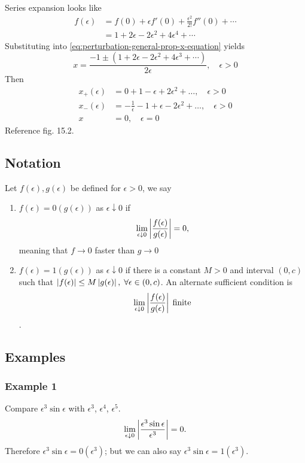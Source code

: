 \documentclass[12pt]{article}
\begin{document}
Series expansion looks like
\begin{equation*}
  \begin{aligned}
    f(\epsilon) &= f(0) + \epsilon f'(0) + \frac{\epsilon^2}{2!}f''(0)+\cdots \\
    &= 1 + 2\epsilon - 2\epsilon^2 + 4\epsilon^4 + \cdots
  \end{aligned}
\end{equation*}
Substituting into \cref{eq:perturbation-general-prop-x-equation} yields
\begin{equation*}
  x = \frac{-1\pm(1+2\epsilon-2\epsilon^2+4\epsilon^3+\cdots)}{2\epsilon},\quad \epsilon>0
\end{equation*}
Then
\begin{equation*}
  \begin{aligned}
    x_+(\epsilon) &= 0 + 1 - \epsilon + 2\epsilon^2+\ldots, \quad \epsilon>0 \\
    x_-(\epsilon) &= -\frac{1}{\epsilon}-1+\epsilon-2\epsilon^2+\ldots,\quad\epsilon>0 \\
    x&=0,\quad \epsilon=0
  \end{aligned}
\end{equation*}
Reference fig. 15.2.

\subsection{Notation}
Let $f(\epsilon),g(\epsilon)$ be defined for $\epsilon>0$, we say
\begin{enumerate}
\item $f(\epsilon)= 0(g(\epsilon))$ as $\epsilon\downarrow0$ if
$$\lim_{\epsilon\downarrow0}\left|{\frac{f(\epsilon)}{g(\epsilon)}}\right|=0,$$ meaning
that $f\rightarrow0$ faster than $g\rightarrow0$
\item $f(\epsilon)=1(g(\epsilon))$ as $\epsilon\downarrow0$ if there is a
  constant $M>0$ and interval $(0,c)$ such that $\left|{f(\epsilon)}\right|\le
  M\left|{g(\epsilon)}\right|,\;\forall\epsilon\in(0,c)$. An alternate sufficient
  condition
  is $$\lim_{\epsilon\downarrow0}\left|{\frac{f(\epsilon)}{g(\epsilon)}}\right|\;\text{finite}$$.
\end{enumerate}

\subsection{Examples}
\subsubsection{Example 1}
Compare $\epsilon^3\sin\epsilon$ with $\epsilon^3$, $\epsilon^4$, $\epsilon^5$.
$$\lim_{\epsilon\downarrow0}\left|{\frac{\epsilon^3\sin\epsilon}{\epsilon^3}}\right|=0.$$
Therefore $\epsilon^3\sin\epsilon=0(\epsilon^3)$; but we can also say
$\epsilon^3\sin\epsilon=1(\epsilon^3)$.
\end{document}
